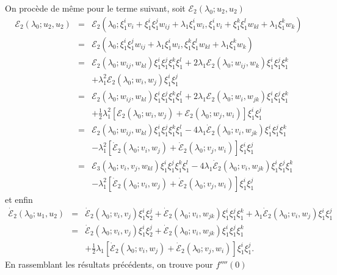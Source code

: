 \documentclass{article}
\begin{document}
On procède de même pour le terme suivant, soit $ℰ_2
(λ_0 ; u_2, u_2)$
\begin{eqnarray*}
  ℰ_2 (λ_0 ; u_2, u_2) & = & ℰ_2 (λ_0 ;
  \xi_1^i v_i + \xi_1^i \xi_1^j w_{i  j} + λ_1 \xi_1^i w_i,
  \xi_1^i v_i + \xi_1^k \xi_1^l w_{k  l} + λ_1 \xi_1^k w_k)\\
  & = & ℰ_2 (λ_0 ; \xi_1^i \xi_1^j w_{i  j} +
  λ_1 \xi_1^i w_i, \xi_1^k \xi_1^l w_{k  l} + λ_1 \xi_1^k
  w_k)\\
  & = & ℰ_2 (λ_0 ; w_{i  j}, w_{k  l})
  \xi_1^i \xi_1^j \xi_1^k \xi_1^l + 2 λ_1 ℰ_2 (λ_0 ;
  w_{i  j}, w_k) \xi_1^i \xi_1^j \xi_1^k\\
  &  &  + λ_1^2 ℰ_2 (λ_0 ; w_i, w_j) \xi_1^i
  \xi_1^j\\
  & = & ℰ_2 (λ_0 ; w_{i  j}, w_{k  l})
  \xi_1^i \xi_1^j \xi_1^k \xi_1^l + 2 λ_1 ℰ_2 (λ_0 ;
  w_i, w_{j  k}) \xi_1^i \xi_1^j \xi_1^k\\
  &  &  + \tfrac{1}{2} λ_1^2  [ℰ_2 (λ_0 ; w_i,
  w_j) +ℰ_2 (λ_0 ; w_j, w_i)] \xi_1^i \xi_1^j\\
  & = & ℰ_2 (λ_0 ; w_{i  j}, w_{k  l})
  \xi_1^i \xi_1^j \xi_1^k \xi_1^l - 4 λ_1  \dot{ℰ}_2
  (λ_0 ; v_i, w_{j  k}) \xi_1^i \xi_1^j \xi_1^k\\
  &  &  - λ_1^2  [\dot{ℰ}_2 (λ_0 ; v_i, w_j) +
  \dot{ℰ}_2 (λ_0 ; v_j, w_i)] \xi_1^i \xi_1^j\\
  & = & ℰ_3 (λ_0 ; v_i, v_j, w_{k  l}) \xi_1^i
  \xi_1^j \xi_1^k \xi_1^l - 4 λ_1  \dot{ℰ}_2 (λ_0 ; v_i,
  w_{j  k}) \xi_1^i \xi_1^j \xi_1^k\\
  &  &  - λ_1^2  [\dot{ℰ}_2 (λ_0 ; v_i, w_j) +
  \dot{ℰ}_2 (λ_0 ; v_j, w_i)] \xi_1^i \xi_1^j
\end{eqnarray*}
et enfin
\begin{eqnarray*}
  \dot{ℰ}_2 (λ_0 ; u_1, u_2) & = & \dot{ℰ}_2
  (λ_0 ; v_i, v_j) \xi_1^i \xi_2^j + \dot{ℰ}_2 (λ_0 ;
  v_i, w_{j  k}) \xi_1^i \xi_1^j \xi_1^k + λ_1
  \dot{ℰ}_2 (λ_0 ; v_i, w_j) \xi_1^i \xi_1^j\\
  & = & \dot{ℰ}_2 (λ_0 ; v_i, v_j) \xi_1^i \xi_2^j +
  \dot{ℰ}_2 (λ_0 ; v_i, w_{j  k}) \xi_1^i \xi_1^j
  \xi_1^k\\
  &  &  + \tfrac{1}{2} λ_1  [\dot{ℰ}_2 (λ_0 ;
  v_i, w_j) + \dot{ℰ}_2 (λ_0 ; v_j, w_i)] \xi_1^i \xi_1^j .
\end{eqnarray*}
En rassemblant les résultats précédents, on trouve pour $f''''
(0)$
\end{document}
